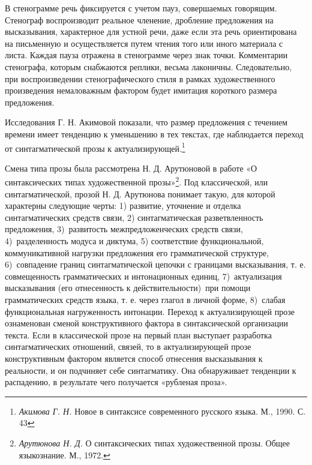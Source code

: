 \documentclass{kursa4}
\begin{document}
      В стенограмме речь фиксируется с учетом пауз, совершаемых говорящим. Стенограф воспроизводит реальное членение, дробление предложения на высказывания, характерное для устной речи, даже если эта речь ориентирована на письменную и осуществляется путем чтения того или иного материала с листа. Каждая пауза отражена в стенограмме через знак точки. Комментарии стенографа, которым снабжаются реплики, весьма лаконичны. Следовательно, при воспроизведении стенографического стиля в рамках художественного произведения немаловажным фактором будет имитация короткого размера предложения. 

      Исследования Г. Н. Акимовой показали, что размер предложения с течением времени имеет тенденцию к уменьшению в тех текстах, где наблюдается переход от синтагматической прозы к актуализирующей.\footnote{\textit{Акимова Г. Н.} Новое в синтаксисе современного русского языка. М., 1990. С. 43} 

      Смена типа прозы была рассмотрена Н. Д. Арутюновой в работе «О синтаксических типах художественной прозы»\footnote{\textit{Арутюнова Н. Д.} О синтаксических типах художественной прозы. Общее языкознание. М., 1972.}. Под классической, или синтагматической, прозой Н. Д. Арутюнова понимает такую, для которой характерны следующие черты: 1) развитие, уточнение и отделка синтагматических средств связи, 2) синтагматическая разветвленность предложения, 3)~развитость межпредложенческих средств связи, 4)~разделенность модуса и диктума, 5) соответствие функциональной, коммуникативной нагрузки предложения его грамматической структуре, 6)~совпадение границ синтагматической цепочки с границами высказывания, т. е. совмещенность грамматических и интонационных единиц, 7)~актуализация высказывания (его отнесенность к действительности)~при помощи грамматических средств языка, т. е. через глагол в личной форме, 8)~слабая функциональная нагруженность интонации. Переход к актуализирующей прозе ознаменован сменой конструктивного фактора в синтаксической организации текста. Если в классической прозе на первый план выступает разработка синтагматических отношений, связей, то в актуализирующей прозе конструктивным фактором является способ отнесения высказывания к реальности, и он подчиняет себе синтагматику. Она обнаруживает тенденции к распадению, в результате чего получается «рубленая проза». 
\end{document}

